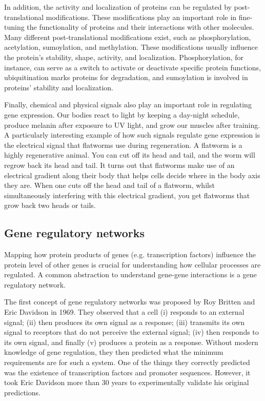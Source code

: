 In addition, the activity and localization of proteins can be regulated by post-translational modifications\cite{Ramazi2021}. These modifications play an important role in fine-tuning the functionality of proteins and their interactions with other molecules. Many different post-translational modifications exist, such as phosphorylation, acetylation, sumoylation, and methylation. These modifications usually influence the protein's stability, shape, activity, and localization. Phosphorylation, for instance, can serve as a switch to activate or deactivate specific protein functions\cite{Cohen2002}, ubiquitination marks proteins for degradation, and sumoylation is involved in proteins' stability and localization\cite{Mazur2012}.

Finally, chemical and physical signals also play an important role in regulating gene expression. Our bodies react to light by keeping a day-night schedule, produce melanin after exposure to UV light, and grow our muscles after training. A particularly interesting example of how such signals regulate gene expression is the electrical signal that flatworms use during regeneration. A flatworm is a highly regenerative animal. You can cut off its head and tail, and the worm will regrow back its head and tail. It turns out that flatworms make use of an electrical gradient along their body that helps cells decide where in the body axis they are. When one cuts off the head and tail of a flatworm, whilst simultaneously interfering with this electrical gradient, you get flatworms that grow back two heads or tails\cite{Levin2014}.

\subsection{Gene regulatory networks}

Mapping how protein products of genes (e.g. transcription factors) influence the protein level of other genes is crucial for understanding how cellular processes are regulated. A common abstraction to understand gene-gene interactions is a gene regulatory network.

The first concept of gene regulatory networks was proposed by Roy Britten and Eric Davidson in 1969\cite{Britten_1969}. They observed that a cell (i) responds to an external signal; (ii) then produces its own signal as a response; (iii) transmits its own signal to receptors that do not perceive the external signal; (iv) then responds to its own signal, and finally (v) produces a protein as a response. Without modern knowledge of gene regulation, they then predicted what the minimum requirements are for such a system. One of the things they correctly predicted was the existence of transcription factors and promoter sequences. However, it took Eric Davidson more than 30 years to experimentally validate his original predictions\cite{Davidson_2002}.

